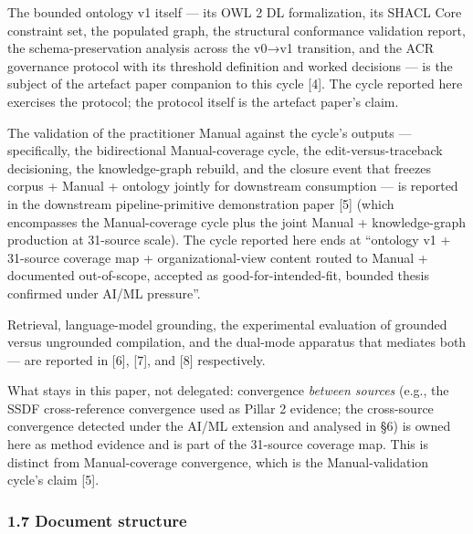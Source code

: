 \documentclass[
]{article}
\begin{document}
The bounded ontology v1 itself --- its OWL 2 DL formalization, its SHACL
Core constraint set, the populated graph, the structural conformance
validation report, the schema-preservation analysis across the v0→v1
transition, and the ACR governance protocol with its threshold
definition and worked decisions --- is the subject of the artefact paper
companion to this cycle {[}4{]}. The cycle reported here exercises the
protocol; the protocol itself is the artefact paper's claim.

The validation of the practitioner Manual against the cycle's outputs
--- specifically, the bidirectional Manual-coverage cycle, the
edit-versus-traceback decisioning, the knowledge-graph rebuild, and the
closure event that freezes corpus + Manual + ontology jointly for
downstream consumption --- is reported in the downstream
pipeline-primitive demonstration paper {[}5{]} (which encompasses the
Manual-coverage cycle plus the joint Manual + knowledge-graph production
at 31-source scale). The cycle reported here ends at ``ontology v1 +
31-source coverage map + organizational-view content routed to Manual +
documented out-of-scope, accepted as good-for-intended-fit, bounded
thesis confirmed under AI/ML pressure''.

Retrieval, language-model grounding, the experimental evaluation of
grounded versus ungrounded compilation, and the dual-mode apparatus that
mediates both --- are reported in {[}6{]}, {[}7{]}, and {[}8{]}
respectively.

What stays in this paper, not delegated: convergence \emph{between
sources} (e.g., the SSDF cross-reference convergence used as Pillar 2
evidence; the cross-source convergence detected under the AI/ML
extension and analysed in §6) is owned here as method evidence and is
part of the 31-source coverage map. This is distinct from
Manual-coverage convergence, which is the Manual-validation cycle's
claim {[}5{]}.

\subsubsection{1.7 Document structure}\label{document-structure}
\end{document}
